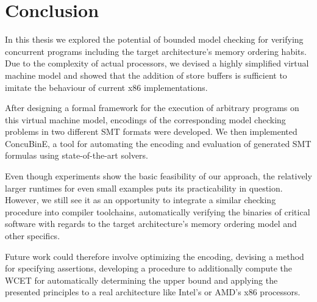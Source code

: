 \section{Conclusion}


In this thesis we explored the potential of bounded model checking for verifying concurrent programs
including the target architecture's memory ordering habits.
Due to the complexity of actual processors, we devised a highly simplified virtual machine model
and showed that the addition of store buffers is sufficient to imitate the behaviour of current x86 implementations.

After designing a formal framework for the execution of arbitrary programs on this virtual machine model,
encodings of the corresponding model checking problems in two different SMT formats were developed.
We then implemented ConcuBinE, a tool for automating the encoding and evaluation of generated SMT formulas using state-of-the-art solvers.

Even though experiments show the basic feasibility of our approach, the relatively larger runtimes for even small examples puts its practicability in question.
However, we still see it as an opportunity to integrate a similar checking procedure into compiler toolchains, automatically verifying the binaries of critical software with regards to the target architecture's memory ordering model and other specifics.

Future work could therefore involve optimizing the encoding,
devising a method for specifying assertions,
developing a procedure to additionally compute the WCET for automatically determining the upper bound and applying the presented principles to a real architecture like Intel's or AMD's x86 processors.
